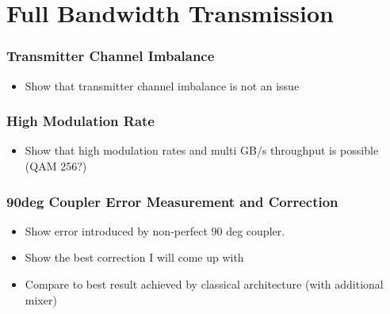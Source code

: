 \chapter{Full Bandwidth Transmission}
\label{chap:res_1800}

\subsection{Transmitter Channel Imbalance}
\begin{itemize}
\item Show that transmitter channel imbalance is not an issue
\end{itemize}

\subsection{High Modulation Rate}
\begin{itemize}
\item Show that high modulation rates and multi GB/s throughput is possible (\gls{QAM} 256?)
\end{itemize}

\subsection{90deg Coupler Error Measurement and Correction}
\begin{itemize}
\item Show error introduced by non-perfect 90 deg coupler.
\item Show the best correction I will come up with
\item Compare to best result achieved by classical architecture (with additional mixer)
\end{itemize}

